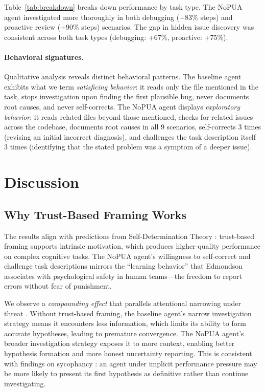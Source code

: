 \documentclass[11pt]{article}
\begin{document}
Table~\ref{tab:breakdown} breaks down performance by task type. The NoPUA agent investigated more thoroughly in both debugging (+83\% steps) and proactive review (+90\% steps) scenarios. The gap in hidden issue discovery was consistent across both task types (debugging: +67\%, proactive: +75\%).

\paragraph{Behavioral signatures.} Qualitative analysis reveals distinct behavioral patterns. The baseline agent exhibits what we term \textit{satisficing behavior}: it reads only the file mentioned in the task, stops investigation upon finding the first plausible bug, never documents root causes, and never self-corrects. The NoPUA agent displays \textit{exploratory behavior}: it reads related files beyond those mentioned, checks for related issues across the codebase, documents root causes in all 9 scenarios, self-corrects 3 times (revising an initial incorrect diagnosis), and challenges the task description itself 3 times (identifying that the stated problem was a symptom of a deeper issue).

\section{Discussion}

\subsection{Why Trust-Based Framing Works}

The results align with predictions from Self-Determination Theory \cite{deci2000self}: trust-based framing supports intrinsic motivation, which produces higher-quality performance on complex cognitive tasks. The NoPUA agent's willingness to self-correct and challenge task descriptions mirrors the ``learning behavior'' that Edmondson  associates with psychological safety in human teams---the freedom to report errors without fear of punishment.

We observe a \textit{compounding effect} that parallels attentional narrowing under threat \cite{easterbrook1959effect, shields2016stress}. Without trust-based framing, the baseline agent's narrow investigation strategy means it encounters less information, which limits its ability to form accurate hypotheses, leading to premature convergence. The NoPUA agent's broader investigation strategy exposes it to more context, enabling better hypothesis formation and more honest uncertainty reporting. This is consistent with findings on sycophancy \cite{sharma2023sycophancy}: an agent under implicit performance pressure may be more likely to present its first hypothesis as definitive rather than continue investigating.
\end{document}
